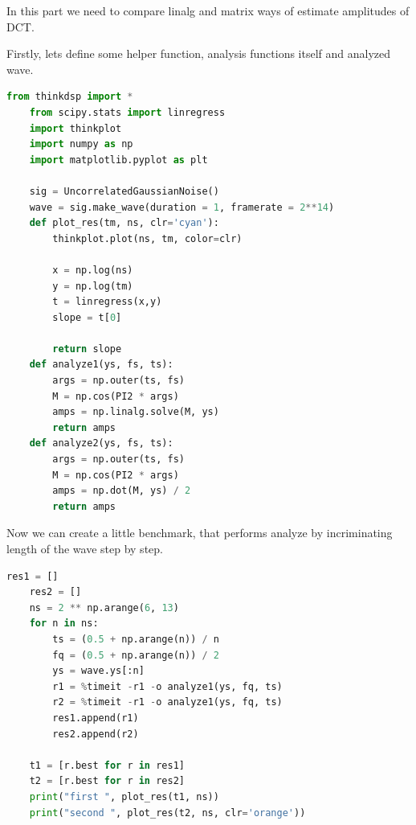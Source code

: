 \documentclass[a4paper]{article}
\begin{document}
        In this part we need to compare linalg and matrix ways of estimate amplitudes of DCT.
        
        Firstly, lets define some helper function, analysis functions itself and analyzed wave.
        
        \begin{lstlisting}[language=Python,caption=Functions definition,label={lst:part1_1}]
    from thinkdsp import *
    from scipy.stats import linregress
    import thinkplot
    import numpy as np
    import matplotlib.pyplot as plt
    
    sig = UncorrelatedGaussianNoise()
    wave = sig.make_wave(duration = 1, framerate = 2**14)
    def plot_res(tm, ns, clr='cyan'):
        thinkplot.plot(ns, tm, color=clr)
        
        x = np.log(ns)
        y = np.log(tm)
        t = linregress(x,y)
        slope = t[0]
        
        return slope
    def analyze1(ys, fs, ts):
        args = np.outer(ts, fs)
        M = np.cos(PI2 * args)
        amps = np.linalg.solve(M, ys)
        return amps
    def analyze2(ys, fs, ts):
        args = np.outer(ts, fs)
        M = np.cos(PI2 * args)
        amps = np.dot(M, ys) / 2
        return amps
        \end{lstlisting}
        
        Now we can create a little benchmark, that performs analyze by incriminating length of the wave step by step.
        
        \begin{lstlisting}[language=Python,caption=Benchmark code,label={lst:part1_1}]
    res1 = []
    res2 = []
    ns = 2 ** np.arange(6, 13)
    for n in ns:
        ts = (0.5 + np.arange(n)) / n
        fq = (0.5 + np.arange(n)) / 2
        ys = wave.ys[:n]
        r1 = %timeit -r1 -o analyze1(ys, fq, ts)
        r2 = %timeit -r1 -o analyze1(ys, fq, ts)
        res1.append(r1)
        res2.append(r2)
    
    t1 = [r.best for r in res1]
    t2 = [r.best for r in res2]
    print("first ", plot_res(t1, ns))
    print("second ", plot_res(t2, ns, clr='orange'))
        \end{lstlisting}
        
\end{document}
